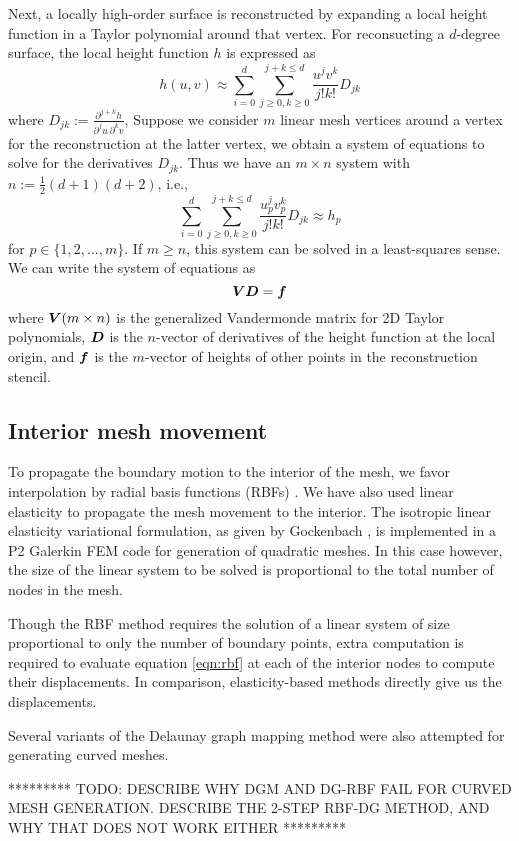 Next, a locally high-order surface is reconstructed by expanding a local height function in a Taylor polynomial around that vertex. For reconsucting a $d$-degree surface, the local height function $h$ is expressed as
\begin{equation}
h(u,v) \approx \sum_{i=0}^d \sum_{j\geq 0,k\geq 0}^{j+k \leq d} \frac{u^j v^k}{j!k!} D_{jk}
\end{equation}
where $D_{jk} := \frac{\partial^{j+k} h}{\partial^j u \, \partial^k v}$,
Suppose we consider $m$ linear mesh vertices around a vertex for the reconstruction at the latter vertex, we obtain a system of equations to solve for the derivatives $D_{jk}$. Thus we have an $m \times n$ system with $n:= \frac12 (d+1)(d+2)$, i.e.,
\begin{equation}
\sum_{i=0}^d \sum_{j\geq 0,k\geq 0}^{j+k \leq d} \frac{u_p^j v_p^k}{j!k!} D_{jk} \approx h_p
\end{equation}
for $p \in \{1,2,...,m \}$. If $m \ge n$, this system can be solved in a least-squares sense. We can write the system of equations as
\begin{equation}
\boldsymbol{V} \boldsymbol{D} = \boldsymbol{f}
\end{equation}
where $\boldsymbol{V} (m\times n)$ is the generalized Vandermonde matrix for 2D Taylor polynomials, $\boldsymbol{D}$ is the $n$-vector of derivatives of the height function at the local origin, and $\boldsymbol{f}$ is the $m$-vector of heights of other points in the reconstruction stencil.

\subsection{Interior mesh movement}

To propagate the boundary motion to the interior of the mesh, we favor interpolation by radial basis functions (RBFs) \cite{mm:rbf}. We have also used linear elasticity to propagate the mesh movement to the interior. The isotropic linear elasticity variational formulation, as given by Gockenbach \cite{gockenbach}, is implemented in a P2 Galerkin FEM code for generation of quadratic meshes. In this case however, the size of the linear system to be solved is proportional to the total number of nodes in the mesh.

Though the RBF method requires the solution of a linear system of size proportional to only the number of boundary points, extra computation is required to evaluate equation \eqref{eqn:rbf} at each of the interior nodes to compute their displacements. In comparison, elasticity-based methods directly give us the displacements.

Several variants of the Delaunay graph mapping method were also attempted for generating curved meshes.

********* TODO: DESCRIBE WHY DGM AND DG-RBF FAIL FOR CURVED MESH GENERATION. DESCRIBE THE 2-STEP RBF-DG METHOD, AND WHY THAT DOES NOT WORK EITHER *********


